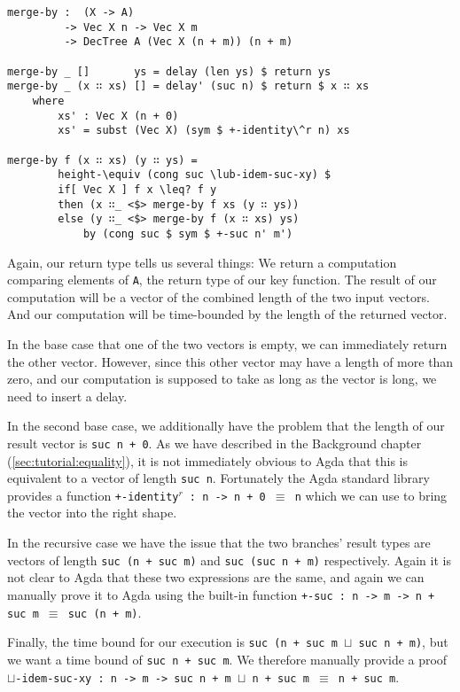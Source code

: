 \begin{lstlisting}[caption={Merging Sorted Vectors},label={lst:merge},emph={merge,by,DecTree,delay,return,delay',if,then,else}]
merge-by :  (X -> A)
         -> Vec X n -> Vec X m
         -> DecTree A (Vec X (n + m)) (n + m)

merge-by _ []       ys = delay (len ys) $ return ys
merge-by _ (x ∷ xs) [] = delay' (suc n) $ return $ x ∷ xs
    where
        xs' : Vec X (n + 0)
        xs' = subst (Vec X) (sym $ +-identity\^r n) xs

merge-by f (x ∷ xs) (y ∷ ys) =
        height-\equiv (cong suc \lub-idem-suc-xy) $
        if[ Vec X ] f x \leq? f y
        then (x ∷_ <$> merge-by f xs (y ∷ ys))
        else (y ∷_ <$> merge-by f (x ∷ xs) ys)
            by (cong suc $ sym $ +-suc n' m')
\end{lstlisting}

Again, our return type tells us several things: We return a computation comparing elements of \texttt{A}, the return type of our key function. The result of our computation will be a vector of the combined length of the two input vectors. And our computation will be time-bounded by the length of the returned vector.

In the base case that one of the two vectors is empty, we can immediately return the other vector. However, since this other vector may have a length of more than zero, and our computation is supposed to take as long as the vector is long, we need to insert a delay.

In the second base case, we additionally have the problem that the length of our result vector is \texttt{suc n + 0}. As we have described in the Background chapter (\autoref{sec:tutorial:equality}), it is not immediately obvious to Agda that this is equivalent to a vector of length \texttt{suc n}. Fortunately the Agda standard library provides a function \texttt{+-identity$^r$ : n -> n + 0 $\equiv$ n} which we can use to bring the vector into the right shape.

In the recursive case we have the issue that the two branches' result types are vectors of length \texttt{suc (n + suc m)} and \texttt{suc (suc n + m)} respectively. Again it is not clear to Agda that these two expressions are the same, and again we can manually prove it to Agda using the built-in function \texttt{+-suc : n -> m -> n + suc m $\equiv$ suc (n + m)}.

Finally, the time bound for our execution is \texttt{suc (n + suc m $\sqcup$ suc n + m)}, but we want a time bound of \texttt{suc n + suc m}. We therefore manually provide a proof \texttt{$\sqcup$-idem-suc-xy : n -> m -> suc n + m $\sqcup$ n + suc m $\equiv$ n + suc m}.


